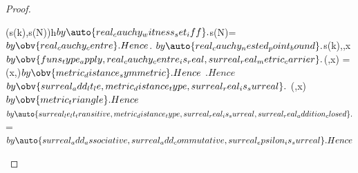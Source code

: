 \begin{proof}
\begin{subproof}
\begin{subproof}
{                    \metricDistance[\RealMetric](s(k),s(N))}{h}$
                by \auto{real_cauchy_witness_set_iff}.
            $s(N)=$
                by \obv{real_cauchy_centre}.
            Hence
                $$.
            $
                {}$
                by \auto{real_cauchy_nested_point_bound}.
            $s(k),,x
                \in\carrier[\RealMetric]$
                by
                \obv{funs_type_apply,real_cauchy_centre_is_real,surreal_real_metric_carrier}.
            $\metricDistance[\RealMetric]
                (,x)
                =\metricDistance[\RealMetric]
                    (x,)$
                by \obv{metric_distance_symmetric}.
            Hence
                $
                    {}$.
            Hence
                $
                    {}$
                by
                \obv{surreal_add_lt_le,metric_distance_type,surreal_real_is_surreal}.
            $
                {
                    {\metricDistance[\RealMetric]
                        (,x)}}$
                by \obv{metric_triangle}.
            Hence
                $
                    {}$
                by
                \auto{surreal_le_lt_transitive,metric_distance_type,surreal_real_is_surreal,surreal_real_addition_closed}.
            $
                =$
                by
                \auto{surreal_add_associative,surreal_add_commutative,surreal_epsilon_is_surreal}.
            Hence
                $

\end{subproof}
\end{subproof}
\end{proof}
